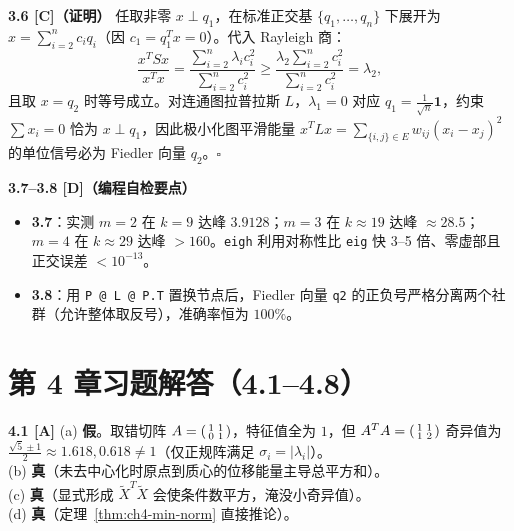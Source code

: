\textbf{3.6 [C]（证明）}
任取非零 $x\perp q_1$，在标准正交基 $\{q_1,\dots,q_n\}$ 下展开为 $x = \sum_{i=2}^n c_i q_i$（因 $c_1 = q_1^T x = 0$）。代入 Rayleigh 商：
\[
  \frac{x^T S x}{x^T x} = \frac{\sum_{i=2}^n \lambda_i c_i^2}{\sum_{i=2}^n c_i^2} \ge \frac{\lambda_2 \sum_{i=2}^n c_i^2}{\sum_{i=2}^n c_i^2} = \lambda_2,
\]
且取 $x = q_2$ 时等号成立。对连通图拉普拉斯 $L$，$\lambda_1=0$ 对应 $q_1 = \frac{1}{\sqrt{n}}\mathbf{1}$，约束 $\sum x_i = 0$ 恰为 $x \perp q_1$，因此极小化图平滑能量 $x^T L x = \sum_{\{i,j\}\in E} w_{ij}(x_i-x_j)^2$ 的单位信号必为 Fiedler 向量 $q_2$。$\square$

\textbf{3.7--3.8 [D]（编程自检要点）}
\begin{itemize}
  \item \textbf{3.7}：实测 $m=2$ 在 $k=9$ 达峰 $3.9128$；$m=3$ 在 $k\approx 19$ 达峰 $\approx 28.5$；$m=4$ 在 $k\approx 29$ 达峰 $>160$。\texttt{eigh} 利用对称性比 \texttt{eig} 快 3--5 倍、零虚部且正交误差 $<10^{-13}$。
  \item \textbf{3.8}：用 \texttt{P @ L @ P.T} 置换节点后，Fiedler 向量 \texttt{q2} 的正负号严格分离两个社群（允许整体取反号），准确率恒为 $100\%$。
\end{itemize}

\section{第 4 章习题解答（4.1--4.8）}

\textbf{4.1 [A]}
(a) \textbf{假}。取错切阵 $A=\begin{psmallmatrix}1&1\\0&1\end{psmallmatrix}$，特征值全为 $1$，但 $A^TA=\begin{psmallmatrix}1&1\\1&2\end{psmallmatrix}$ 奇异值为 $\frac{\sqrt{5}\pm 1}{2}\approx 1.618, 0.618 \neq 1$（仅正规阵满足 $\sigma_i = |\lambda_i|$）。\\
(b) \textbf{真}（未去中心化时原点到质心的位移能量主导总平方和）。\\
(c) \textbf{真}（显式形成 $\widetilde{X}^T\widetilde{X}$ 会使条件数平方，淹没小奇异值）。\\
(d) \textbf{真}（定理~\ref{thm:ch4-min-norm} 直接推论）。

